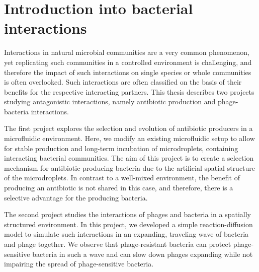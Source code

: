 \chapter{Introduction into bacterial interactions}
Interactions in natural microbial communities are a very common phenomenon, yet replicating such communities in a controlled environment is challenging, and therefore the impact of such interactions on single species or whole communities is often overlooked. Such interactions are often classified on the basis of their benefits for the respective interacting partners. This thesis describes two projects studying antagonistic interactions, namely antibiotic production and phage-bacteria interactions. 

The first project explores the selection and evolution of antibiotic producers in a microfluidic environment. Here, we modify an existing microfluidic setup to allow for stable production and long-term incubation of microdroplets, containing interacting bacterial communities. The aim of this project is to create a selection mechanism for antibiotic-producing bacteria due to the artificial spatial structure of the microdroplets. In contrast to a well-mixed environment, the benefit of producing an antibiotic is not shared in this case, and therefore, there is a selective advantage for the producing bacteria. 

The second project studies the interactions of phages and bacteria in a spatially structured environment. In this project, we developed a simple reaction-diffusion model to simulate such interactions in an expanding, traveling wave of bacteria and phage together. We observe that phage-resistant bacteria can protect phage-sensitive bacteria in such a wave and can slow down phages expanding while not impairing the spread of phage-sensitive bacteria.